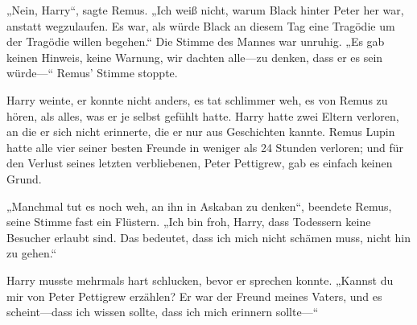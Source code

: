 „Nein, Harry“, sagte Remus. „Ich weiß nicht, warum Black hinter Peter her war, anstatt wegzulaufen. Es war, als würde Black an diesem Tag eine Tragödie um der Tragödie willen begehen.“ Die Stimme des Mannes war unruhig. „Es gab keinen Hinweis, keine Warnung, wir dachten alle—zu denken, dass er es sein würde—“ Remus' Stimme stoppte.

Harry weinte, er konnte nicht anders, es tat schlimmer weh, es von Remus zu hören, als alles, was er je selbst gefühlt hatte. Harry hatte zwei Eltern verloren, an die er sich nicht erinnerte, die er nur aus Geschichten kannte. Remus Lupin hatte alle vier seiner besten Freunde in weniger als 24 Stunden verloren; und für den Verlust seines letzten verbliebenen, Peter Pettigrew, gab es einfach keinen Grund.

„Manchmal tut es noch weh, an ihn in Askaban zu denken“, beendete Remus, seine Stimme fast ein Flüstern. „Ich bin froh, Harry, dass Todessern keine Besucher erlaubt sind. Das bedeutet, dass ich mich nicht schämen muss, nicht hin zu gehen.“

Harry musste mehrmals hart schlucken, bevor er sprechen konnte. „Kannst du mir von Peter Pettigrew erzählen? Er war der Freund meines Vaters, und es scheint—dass ich wissen sollte, dass ich mich erinnern sollte—“

